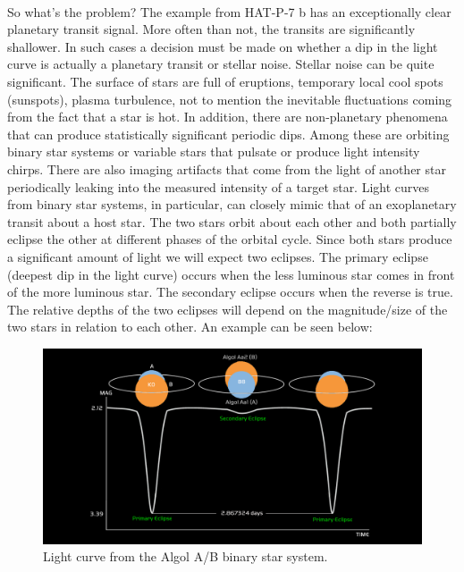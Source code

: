 \documentclass{article}
\begin{document}
\paragraph{} So what's the problem? The example from HAT-P-7 b has an exceptionally clear planetary transit signal. More often than not, the transits are significantly shallower. In such cases a decision must be made on whether a dip in the light curve is actually a planetary transit or stellar noise. Stellar noise can be quite significant. The surface of stars are full of eruptions, temporary local cool spots (sunspots), plasma turbulence, not to mention the inevitable fluctuations coming from the fact that a star is hot. 
In addition, there are non-planetary phenomena that can produce statistically significant periodic dips. Among these are orbiting binary star systems or variable stars that pulsate or produce light intensity chirps. There are also imaging artifacts that come from the light of another star periodically leaking into the measured intensity of a target star. Light curves from binary star systems, in particular, can closely mimic that of an exoplanetary transit about a host star. The two stars orbit about each other and both partially eclipse the other at different phases of the orbital cycle. Since both stars produce a significant amount of light we will expect two eclipses. The primary eclipse (deepest dip in the light curve) occurs when the less luminous star comes in front of the more luminous star. The secondary eclipse occurs when the reverse is true. The relative depths of the two eclipses will depend on the magnitude/size of the two stars in relation to each other. An example can be seen below:
 \begin{figure}[H]
	\begin{center}
		\includegraphics[totalheight=6cm]{figures/algol-curve.png}
	\end{center}
	\caption{Light curve from the Algol A/B binary star system.}
\end{figure}
\end{document}
